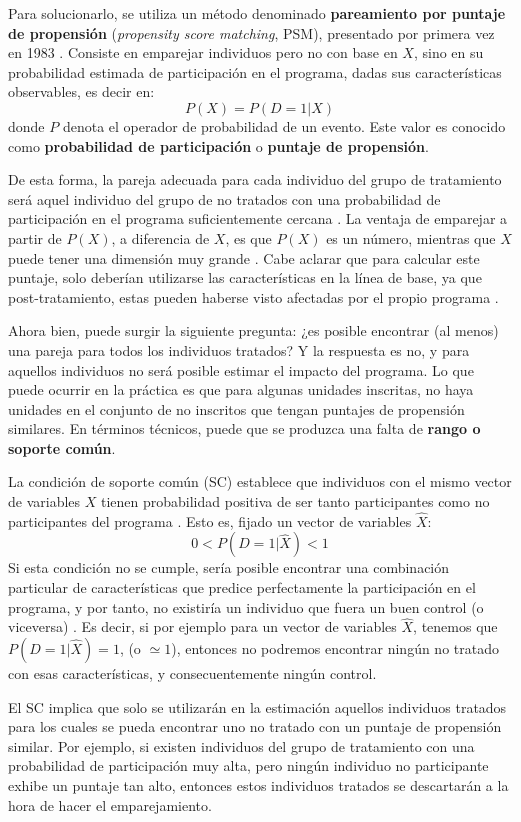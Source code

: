 \documentclass[../../main.tex]{subfiles}
\begin{document}
Para solucionarlo, se utiliza un método denominado \textbf{pareamiento por puntaje de
propensión} (\textit{propensity score matching}, PSM), presentado por primera vez en 1983
\cite{psm1983}. Consiste en emparejar individuos pero no con base en \(X\), sino en su
probabilidad estimada de participación en el programa, dadas sus características
observables, es decir en:
\[P(X) = P(D = 1|X)\] donde \(P\) denota el operador de probabilidad de un evento. Este
valor es conocido como \textbf{probabilidad de participación} o \textbf{puntaje de
propensión}.

De esta forma, la pareja adecuada para cada individuo del grupo de tratamiento será aquel
individuo del grupo de no tratados con una probabilidad de participación en el programa
suficientemente cercana \cite{bernal}. La ventaja de emparejar a partir de \(P(X)\), a
diferencia de \(X\), es que \(P(X)\) es un número, mientras que \(X\) puede tener una
dimensión muy grande \cite{bernal}. Cabe aclarar que para calcular este puntaje, solo
deberían utilizarse las características en la línea de base, ya que post-tratamiento,
estas pueden haberse visto afectadas por el propio programa \cite{gertler-2016}.

Ahora bien, puede surgir la siguiente pregunta: ¿es posible encontrar (al menos) una pareja
para todos los individuos tratados? Y la respuesta es no, y para aquellos individuos no
será posible estimar el impacto del programa. Lo que puede ocurrir en la práctica es que
para algunas unidades inscritas, no haya unidades en el conjunto de no inscritos que
tengan puntajes de propensión similares. En términos técnicos, puede que se produzca una
falta de \textbf{rango o soporte común}.

La condición de soporte común (SC) establece que individuos con el mismo vector de
variables \(X\) tienen probabilidad positiva de ser tanto participantes como no
participantes del programa \cite{bernal}. Esto es, fijado un vector de variables
\(\hat{X}\):
\[0 < P(D=1|\hat{X}) < 1\] Si esta condición no se cumple, sería posible encontrar una
combinación particular de características que predice perfectamente la participación en el
programa, y por tanto, no existiría un individuo que fuera un buen control (o viceversa)
\cite{bernal}. Es decir, si por ejemplo para un vector de variables \(\hat{X}\), tenemos
que \(P(D=1|\hat{X})=1\), (o \(\simeq 1\)), entonces no podremos encontrar ningún no
tratado con esas características, y consecuentemente ningún control.

El SC implica que solo se utilizarán en la estimación aquellos individuos tratados para
los cuales se pueda encontrar uno no tratado con un puntaje de propensión similar. Por
ejemplo, si existen individuos del grupo de tratamiento con una probabilidad de
participación muy alta, pero ningún individuo no participante exhibe un puntaje tan alto,
entonces estos individuos tratados se descartarán a la hora de hacer el emparejamiento.
\end{document}
